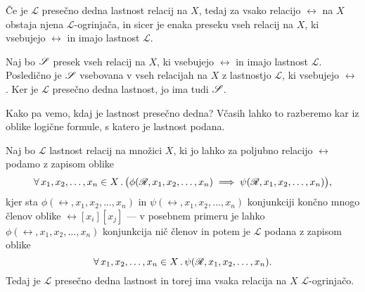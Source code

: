                 \begin{trditev}\label{trditev:obstoj-ogrinjace-iz-presecne-dednosti}
                        Če je $\mathscr{L}$ presečno dedna lastnost relacij na $X$, tedaj za vsako relacijo $\rel$ na $X$ obstaja njena $\mathscr{L}$-ogrinjača, in sicer je enaka preseku vseh relacij na $X$, ki vsebujejo $\rel$ in imajo lastnost $\mathscr{L}$.
                \end{trditev}

                \begin{dokaz}
                        Naj bo $\srel$ presek vseh relacij na $X$, ki vsebujejo $\rel$ in imajo lastnost $\mathscr{L}$. Posledično je $\srel$ vsebovana v vseh relacijah na $X$ z lastnostjo $\mathscr{L}$, ki vsebujejo $\rel$. Ker je $\mathscr{L}$ presečno dedna lastnost, jo ima tudi $\srel$.
                \end{dokaz}

                Kako pa vemo, kdaj je lastnost presečno dedna? Včasih lahko to razberemo kar iz oblike logične formule, s katero je lastnost podana.

                \begin{izrek}\label{izrek:presecna-dednost-iz-logicne-oblike}
                        Naj bo $\mathscr{L}$ lastnost relacij na množici $X$, ki jo lahko za poljubno relacijo $\rel$ podamo z zapisom oblike
                        \[\all[1]{x_1, x_2, \ldots, x_n}[X]{\phi(\rel, x_1, x_2, \ldots, x_n) \implies \psi(\rel, x_1, x_2, \ldots, x_n)},\]
                        kjer sta $\phi(\rel, x_1, x_2, \ldots, x_n)$ in $\psi(\rel, x_1, x_2, \ldots, x_n)$ konjunkciji končno mnogo členov oblike $\rel[x_i][x_j]$ --- v posebnem primeru je lahko $\phi(\rel, x_1, x_2, \ldots, x_n)$ konjunkcija nič členov in potem je $\mathscr{L}$ podana z zapisom oblike
                        \[\xall{x_1, x_2, \ldots, x_n}[X]{\psi(\rel, x_1, x_2, \ldots, x_n)}.\]
                        Tedaj je $\mathscr{L}$ presečno dedna lastnost in torej ima vsaka relacija na $X$ $\mathscr{L}$-ogrinjačo.
                \end{izrek}

